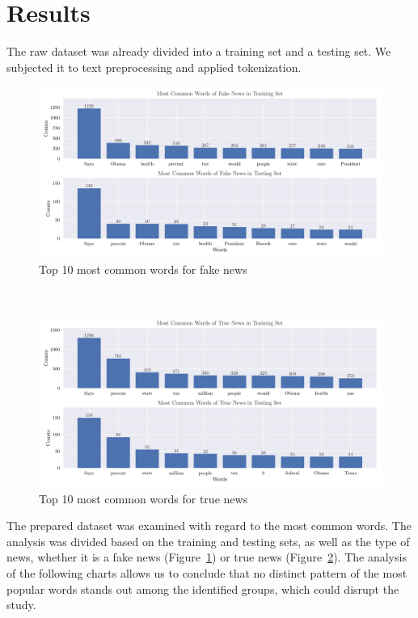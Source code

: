 \section{Results}
The raw dataset was already divided into a training set and a testing set. We subjected it to text preprocessing and applied tokenization.

\begin{figure}[ht]
\centering
\includegraphics[width=0.95\linewidth]{top10_common_words_fake.png}
\caption{Top 10 most common words for fake news}
\label{top10_common_words_fake}
\end{figure}

\

\begin{figure}[ht]
\centering
\includegraphics[width=0.95\linewidth]{top10_common_words_true.png}
\caption{Top 10 most common words for true news}
\label{top10_common_words_true}
\end{figure}

The prepared dataset was examined with regard to the most common words. The analysis was divided based on the training and testing sets, as well as the type of news, whether it is a fake news (Figure~\ref{top10_common_words_fake}) or true news (Figure~\ref{top10_common_words_true}). The analysis of the following charts allows us to conclude that no distinct pattern of the most popular words stands out among the identified groups, which could disrupt the study.

